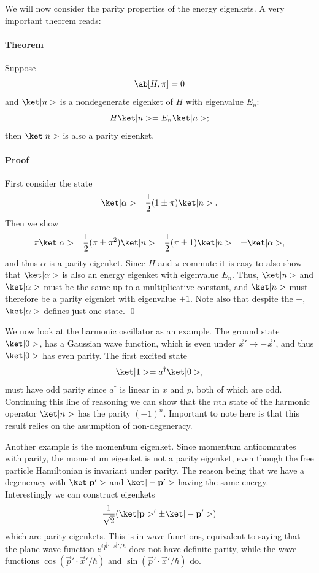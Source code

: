We will now consider the parity properties of the energy eigenkets. A very important theorem reads:
\paragraph{Theorem} Suppose
\begin{equation}
    \comm{H}{\pi} = 0
\end{equation}
and $\k{n}$ is a nondegenerate eigenket of $H$ with eigenvalue $E_n$:
\begin{equation}
    H\k{n} = E_n \k{n};
\end{equation}
then $\k{n}$ is also a parity eigenket.
\paragraph{Proof} First consider the state
\begin{equation}
    \k{\alpha} = \frac{1}{2}(1\pm \pi)\k{n}.
\end{equation}
Then we show
\begin{equation}
    \pi\k{\alpha} = \frac{1}{2}(\pi \pm \pi^2)\k{n} = \frac{1}{2}(\pi \pm 1)\k{n} = \pm \k{\alpha},
\end{equation}
and thus $\alpha$ is a parity eigenket. Since $H$ and $\pi$ commute it is easy to also show that $\k{\alpha}$ is also an energy eigenket with eigenvalue $E_n$. Thus, $\k{n}$ and $\k{\alpha}$ must be the same up to a multiplicative constant, and $\k{n}$ must therefore be a parity eigenket with eigenvalue $\pm 1$. Note also that despite the $\pm$, $\k{\alpha}$ defines just one state. \qed

We now look at the harmonic oscillator as an example. The ground state $\k{0}$, has a Gaussian wave function, which is even under $\vec{x}' \to -\vec{x}'$, and thus $\k{0}$ has even parity. The first excited state
\begin{equation}
    \k{1} = a^\dagger\k{0},
\end{equation}
must have odd parity since $a^\dagger$ is linear in $x$ and $p$, both of which are odd. Continuing this line of reasoning we can show that the $n$th state of the harmonic operator $\k{n}$ has the parity $(-1)^n$. Important to note here is that this result relies on the assumption of non-degeneracy. 

Another example is the momentum eigenket. Since momentum anticommutes with parity, the momentum eigenket is not a parity eigenket, even though the free particle Hamiltonian is invariant under parity. The reason being that we have a degeneracy with $\k{\vec{p}'}$ and $\k{-\vec{p}'}$ having the same energy. Interestingly we can construct eigenkets
\begin{equation}
    \frac{1}{\sqrt{2}}(\k{\vec{p}}' \pm \k{-\vec{p}'})
\end{equation}
which are parity eigenkets. This is in wave functions, equivalent to saying that the plane wave function $e^{i\vec{p}'\cdot\vec{x}'/\hbar}$ does not have definite parity, while the wave functions $\cos(\vec{p}'\cdot\vec{x}'/\hbar)$ and $\sin(\vec{p}'\cdot\vec{x}'/\hbar)$ do.

